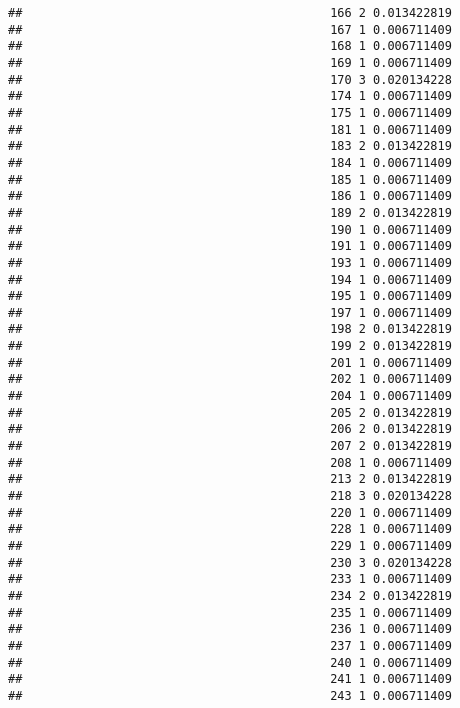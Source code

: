 \documentclass[
]{article}
\begin{document}
\begin{verbatim}
##                                           166 2 0.013422819
##                                           167 1 0.006711409
##                                           168 1 0.006711409
##                                           169 1 0.006711409
##                                           170 3 0.020134228
##                                           174 1 0.006711409
##                                           175 1 0.006711409
##                                           181 1 0.006711409
##                                           183 2 0.013422819
##                                           184 1 0.006711409
##                                           185 1 0.006711409
##                                           186 1 0.006711409
##                                           189 2 0.013422819
##                                           190 1 0.006711409
##                                           191 1 0.006711409
##                                           193 1 0.006711409
##                                           194 1 0.006711409
##                                           195 1 0.006711409
##                                           197 1 0.006711409
##                                           198 2 0.013422819
##                                           199 2 0.013422819
##                                           201 1 0.006711409
##                                           202 1 0.006711409
##                                           204 1 0.006711409
##                                           205 2 0.013422819
##                                           206 2 0.013422819
##                                           207 2 0.013422819
##                                           208 1 0.006711409
##                                           213 2 0.013422819
##                                           218 3 0.020134228
##                                           220 1 0.006711409
##                                           228 1 0.006711409
##                                           229 1 0.006711409
##                                           230 3 0.020134228
##                                           233 1 0.006711409
##                                           234 2 0.013422819
##                                           235 1 0.006711409
##                                           236 1 0.006711409
##                                           237 1 0.006711409
##                                           240 1 0.006711409
##                                           241 1 0.006711409
##                                           243 1 0.006711409

\end{verbatim}
\end{document}
